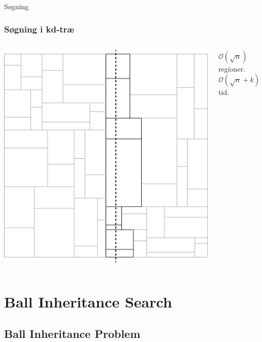 \documentclass[pdf]{beamer}
\begin{document}
\begin{frame}{Søgning}
  \frametitle{Søgning i kd-træ}
  \begin{columns}
  \begin{center}
    \includegraphics[scale=0.75]{pictures/kd_bound2.png}
  \end{center}
  $\mathcal{O}(\sqrt{n})$ regioner.\\

  $\mathcal{O}(\sqrt{n} + k)$ tid.
\end{columns}
\end{frame}



\section{Ball Inheritance Search}

\subsection{Ball Inheritance Problem}
\end{document}
